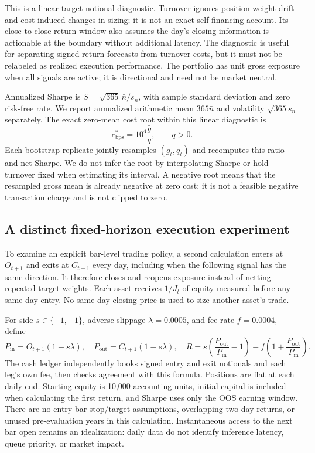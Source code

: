 \documentclass[preprint,12pt,authoryear]{elsarticle}
\begin{document}
This is a linear target-notional diagnostic. Turnover ignores position-weight drift and cost-induced changes in sizing; it is not an exact self-financing account. Its close-to-close return window also assumes the day's closing information is actionable at the boundary without additional latency. The diagnostic is useful for separating signed-return forecasts from turnover costs, but it must not be relabeled as realized execution performance. The portfolio has unit gross exposure when all signals are active; it is directional and need not be market neutral.

Annualized Sharpe is $S=\sqrt{365}\,\bar n/s_n$, with sample standard deviation and zero risk-free rate. We report annualized arithmetic mean $365\bar n$ and volatility $\sqrt{365}s_n$ separately. The exact zero-mean cost root within this linear diagnostic is
\begin{equation}\label{eq:root}
 c^*_{\mathrm{bps}}=10^4\frac{\bar g}{\bar q},\qquad \bar q>0.
\end{equation}
Each bootstrap replicate jointly resamples $(g_t,q_t)$ and recomputes this ratio and net Sharpe. We do not infer the root by interpolating Sharpe or hold turnover fixed when estimating its interval. A negative root means that the resampled gross mean is already negative at zero cost; it is not a feasible negative transaction charge and is not clipped to zero.

\subsection{A distinct fixed-horizon execution experiment}
To examine an explicit bar-level trading policy, a second calculation enters at $O_{t+1}$ and exits at $C_{t+1}$ every day, including when the following signal has the same direction. It therefore closes and reopens exposure instead of netting repeated target weights. Each asset receives $1/J_t$ of equity measured before any same-day entry. No same-day closing price is used to size another asset's trade.

For side $s\in\{-1,+1\}$, adverse slippage $\lambda=0.0005$, and fee rate $f=0.0004$, define
\begin{equation}
 P_{\mathrm{in}}=O_{t+1}(1+s\lambda),\quad
 P_{\mathrm{out}}=C_{t+1}(1-s\lambda),\quad
 R=s\left(\frac{P_{\mathrm{out}}}{P_{\mathrm{in}}}-1\right)
      -f\left(1+\frac{P_{\mathrm{out}}}{P_{\mathrm{in}}}\right).
\end{equation}
The cash ledger independently books signed entry and exit notionals and each leg's own fee, then checks agreement with this formula. Positions are flat at each daily end. Starting equity is 10,000 accounting units, initial capital is included when calculating the first return, and Sharpe uses only the OOS earning window. There are no entry-bar stop/target assumptions, overlapping two-day returns, or unused pre-evaluation years in this calculation. Instantaneous access to the next bar open remains an idealization: daily data do not identify inference latency, queue priority, or market impact.
\end{document}
